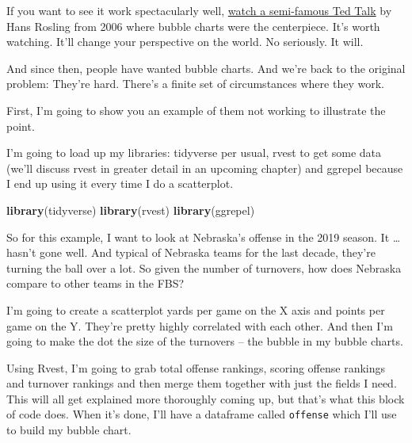 \documentclass[
]{book}
\newenvironment{Shaded}{\begin{snugshade}}{\end{snugshade}}
\newcommand{\KeywordTok}[1]{\textcolor[rgb]{0.13,0.29,0.53}{\textbf{#1}}}
\newcommand{\NormalTok}[1]{#1}
\begin{document}
If you want to see it work spectacularly well, \href{https://www.youtube.com/watch?v=hVimVzgtD6w}{watch a semi-famous Ted Talk} by Hans Rosling from 2006 where bubble charts were the centerpiece. It's worth watching. It'll change your perspective on the world. No seriously. It will.

And since then, people have wanted bubble charts. And we're back to the original problem: They're hard. There's a finite set of circumstances where they work.

First, I'm going to show you an example of them not working to illustrate the point.

I'm going to load up my libraries: tidyverse per usual, rvest to get some data (we'll discuss rvest in greater detail in an upcoming chapter) and ggrepel because I end up using it every time I do a scatterplot.

\begin{Shaded}
\begin{Highlighting}[]
\KeywordTok{library}\NormalTok{(tidyverse)}
\KeywordTok{library}\NormalTok{(rvest)}
\KeywordTok{library}\NormalTok{(ggrepel)}
\end{Highlighting}
\end{Shaded}

So for this example, I want to look at Nebraska's offense in the 2019 season. It \ldots{} hasn't gone well. And typical of Nebraska teams for the last decade, they're turning the ball over a lot. So given the number of turnovers, how does Nebraska compare to other teams in the FBS?

I'm going to create a scatterplot yards per game on the X axis and points per game on the Y. They're pretty highly correlated with each other. And then I'm going to make the dot the size of the turnovers -- the bubble in my bubble charts.

Using Rvest, I'm going to grab total offense rankings, scoring offense rankings and turnover rankings and then merge them together with just the fields I need. This will all get explained more thoroughly coming up, but that's what this block of code does. When it's done, I'll have a dataframe called \texttt{offense} which I'll use to build my bubble chart.
\end{document}
